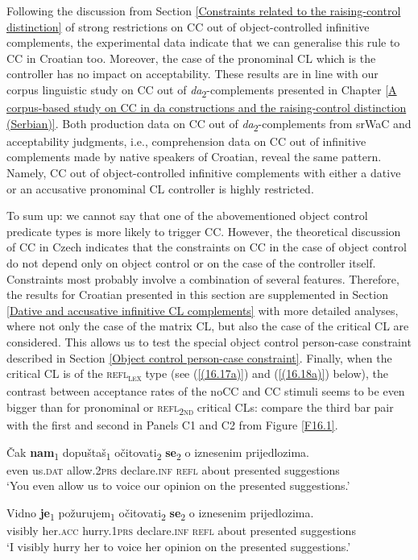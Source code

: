 \noindent Following the discussion from Section \ref{Constraints related to the raising-control distinction} of strong restrictions on CC out of object-controlled infinitive complements, the experimental data indicate that we can generalise this rule to CC in Croatian too. Moreover, the case of the pronominal CL which is the controller has no impact on acceptability. These results are in line with our corpus linguistic study on CC out of \textit{da}\textsubscript{2}-complements presented in Chapter \ref{A corpus-based study on CC in da constructions and the raising-control distinction (Serbian)}. Both production data on CC out of \textit{da}\textsubscript{2}-complements from srWaC and acceptability judgments, i.e., comprehension data on CC out of infinitive complements made by native speakers of Croatian, reveal the same pattern. Namely, CC out of object-controlled infinitive complements with either a dative or an accusative pronominal CL controller is highly restricted.

To sum up: we cannot say that one of the abovementioned object control predicate types is more likely to trigger CC. However, the theoretical discussion of CC in Czech indicates that the constraints on CC in the case of object control do not depend only on object control or on the case of the controller itself. Constraints most probably involve a combination of several features. Therefore, the results for Croatian presented in this section are supplemented in Section \ref{Dative and accusative infinitive CL complements} with more detailed analyses, where not only the case of the matrix CL, but also the case of the critical CL are considered. This allows us to test the special object control person-case constraint described in Section \ref{Object control person-case constraint}. Finally, when the critical CL is of the \textsc{refl\textsubscript{\textsc{lex}}} type (see (\ref{(16.17a)}) and (\ref{(16.18a)}) below), the contrast between acceptance rates of the noCC and CC stimuli seems to be even bigger than for pronominal or \textsc{refl\textsubscript{2nd}} critical CLs: compare the third bar pair with the first and second in Panels C1 and C2 from Figure \ref{F16.1}.

\begin{exe}\ex\label{(16.17a)}
\gll Čak \textbf{nam}\textsubscript{1} dopuštaš\textsubscript{1} očitovati\textsubscript{2} \textbf{se}\textsubscript{2} o iznesenim prijedlozima.\\
 even us.\textsc{dat} allow.2\textsc{prs} declare.\textsc{inf} \textsc{refl} about presented suggestions\\
\glt ‘You even allow us to voice our opinion on the presented suggestions.’

\ex\label{(16.18a)}
\gll Vidno \textbf{je}\textsubscript{1} požurujem\textsubscript{1} očitovati\textsubscript{2} \textbf{se}\textsubscript{2} o iznesenim prijedlozima.\\
 visibly her.\textsc{acc} hurry.1\textsc{prs} declare.\textsc{inf} \textsc{refl} about presented suggestions \\
\glt ‘I visibly hurry her to voice her opinion on the presented suggestions.’ 
\end{exe}
 
